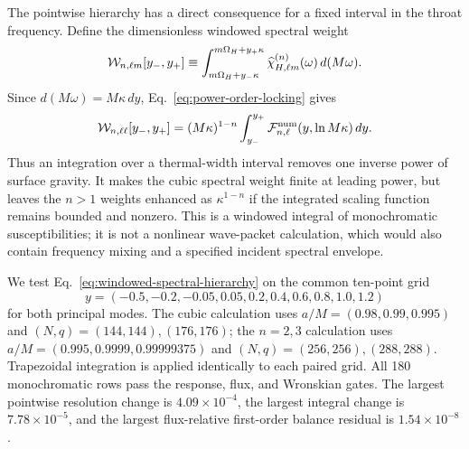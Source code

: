 \documentclass[aps,prd,twocolumn,10pt,nofootinbib,superscriptaddress,floatfix]{revtex4-2}
\begin{document}
The pointwise hierarchy has a direct consequence for a fixed interval in the
throat frequency.  Define the dimensionless windowed spectral weight
\begin{equation}
 {\cal W}_{n,\ell m}[y_-,y_+]
 \equiv\int_{m\Omega_H+y_-\kappa}^{m\Omega_H+y_+\kappa}
 \widehat\chi_{H,\ell m}^{(n)}(\omega)\,d(M\omega).
 \label{eq:windowed-spectral-weight}
\end{equation}
Since $d(M\omega)=M\kappa\,dy$, Eq.~\eqref{eq:power-order-locking} gives
\begin{equation}
 {\cal W}_{n,\ell\ell}[y_-,y_+]
 =(M\kappa)^{1-n}\int_{y_-}^{y_+}
 {\cal F}^{\rm num}_{n,\ell}(y,\ln M\kappa)\,dy .
 \label{eq:windowed-spectral-hierarchy}
\end{equation}
Thus an integration over a thermal-width interval removes one inverse power
of surface gravity.  It makes the cubic spectral weight finite at leading
power, but leaves the $n>1$ weights enhanced as $\kappa^{1-n}$ if the
integrated scaling function remains bounded and nonzero.  This is a
windowed integral of monochromatic susceptibilities; it is not a nonlinear
wave-packet calculation, which would also contain frequency mixing and a
specified incident spectral envelope.

We test Eq.~\eqref{eq:windowed-spectral-hierarchy} on the common ten-point grid
\begin{equation}
 y=(-0.5,-0.2,-0.05,0.05,0.2,0.4,0.6,0.8,1.0,1.2)
 \label{eq:bandwidth-y-grid}
\end{equation}
for both principal modes.  The cubic calculation uses
$a/M=(0.98,0.99,0.995)$ and $(N,q)=(144,144),(176,176)$; the $n=2,3$
calculation uses $a/M=(0.995,0.9999,0.99999375)$ and
$(N,q)=(256,256),(288,288)$.  Trapezoidal integration is applied identically
to each paired grid.  All 180 monochromatic rows pass the response, flux, and
Wronskian gates.  The largest pointwise resolution change is
$4.09\times10^{-4}$, the largest integral change is $7.78\times10^{-5}$,
and the largest flux-relative first-order balance residual is
$1.54\times10^{-8}$.
\end{document}
